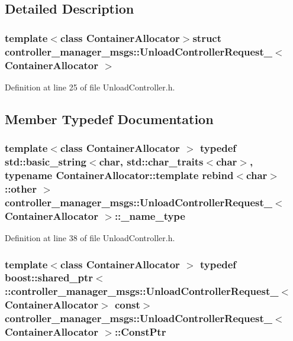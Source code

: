 \subsection{\-Detailed \-Description}
\subsubsection*{template$<$class Container\-Allocator$>$struct controller\-\_\-manager\-\_\-msgs\-::\-Unload\-Controller\-Request\-\_\-$<$ Container\-Allocator $>$}



\-Definition at line 25 of file \-Unload\-Controller.\-h.



\subsection{\-Member \-Typedef \-Documentation}
\subsubsection[{\-\_\-name\-\_\-type}]{\setlength{\rightskip}{0pt plus 5cm}template$<$class Container\-Allocator $>$ typedef std\-::basic\-\_\-string$<$char, std\-::char\-\_\-traits$<$char$>$, typename \-Container\-Allocator\-::template rebind$<$char$>$\-::other $>$ {\bf controller\-\_\-manager\-\_\-msgs\-::\-Unload\-Controller\-Request\-\_\-}$<$ \-Container\-Allocator $>$\-::{\bf \-\_\-name\-\_\-type}}\label{structcontroller__manager__msgs_1_1UnloadControllerRequest___a7ba67bf8d8bff3980cd6ef036e1f90dd}


\-Definition at line 38 of file \-Unload\-Controller.\-h.

\subsubsection[{\-Const\-Ptr}]{\setlength{\rightskip}{0pt plus 5cm}template$<$class Container\-Allocator $>$ typedef boost\-::shared\-\_\-ptr$<$ \-::{\bf controller\-\_\-manager\-\_\-msgs\-::\-Unload\-Controller\-Request\-\_\-}$<$\-Container\-Allocator$>$ const$>$ {\bf controller\-\_\-manager\-\_\-msgs\-::\-Unload\-Controller\-Request\-\_\-}$<$ \-Container\-Allocator $>$\-::{\bf \-Const\-Ptr}}\label{structcontroller__manager__msgs_1_1UnloadControllerRequest___a8060fe8956ae695f13b9bb75dfb0f840}


